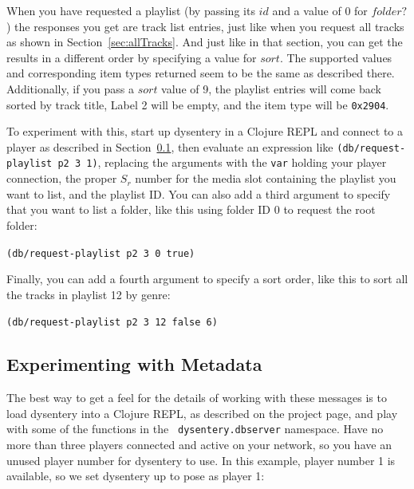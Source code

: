 \documentclass[11pt]{article}
\begin{document}
When you have requested a playlist (by passing its $id$ and a value of
0 for $folder?$) the responses you get are track list entries, just
like when you request all tracks as shown in
Section~\ref{sec:allTracks}. And just like in that section, you can
get the results in a different order by specifying a value for $sort$.
The supported values and corresponding item types returned seem to be
the same as described there. Additionally, if you pass a $sort$ value
of 9, the playlist entries will come back sorted by track title, Label
2 will be empty, and the item type will be {\tt 0x2904}.

To experiment with this, start up dysentery in a Clojure REPL and
connect to a player as described in Section~\ref{sec:experimenting},
then evaluate an expression like {\tt (db/request-playlist p2 3 1)},
replacing the arguments with the {\tt var} holding your player
connection, the proper $S_r$ number for the media slot containing the
playlist you want to list, and the playlist ID. You can also add a
third argument to specify that you want to list a folder, like this
using folder ID 0 to request the root folder:

{\tt (db/request-playlist p2 3 0 true)}

Finally, you can add a fourth argument to specify a sort order, like
this to sort all the tracks in playlist 12 by genre:

{\tt (db/request-playlist p2 3 12 false 6)}

\subsection{Experimenting with Metadata}
\label{sec:experimenting}

The best way to get a feel for the details of working with these
messages is to load dysentery into a Clojure REPL, as described on the
project page, and play with some of the functions in the {\tt
  dysentery.dbserver} namespace. Have no more than three players
connected and active on your network, so you have an unused player
number for dysentery to use. In this example, player number 1 is
available, so we set dysentery up to pose as player 1:
\end{document}
